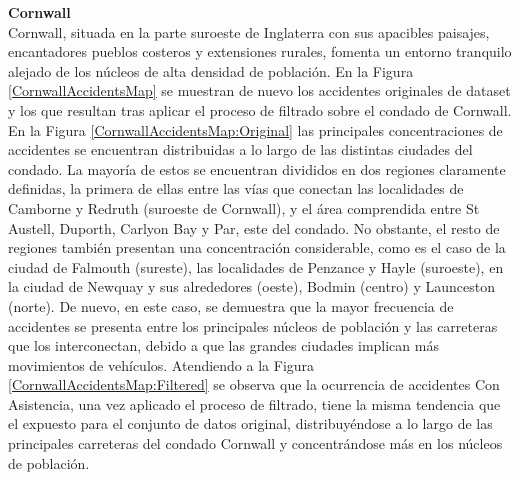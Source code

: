 \textbf{Cornwall}\\

Cornwall, situada en la parte suroeste de Inglaterra con sus apacibles paisajes, encantadores pueblos costeros y extensiones rurales, fomenta un entorno tranquilo alejado de los núcleos de alta densidad de población. En la Figura \ref{CornwallAccidentsMap} se muestran de nuevo los accidentes originales de dataset y los que resultan tras aplicar el proceso de filtrado sobre el condado de Cornwall. En la Figura \ref{CornwallAccidentsMap:Original} las principales concentraciones de accidentes se encuentran distribuidas a lo largo de las distintas ciudades del condado. La mayoría de estos se encuentran divididos en dos regiones claramente definidas, la primera de ellas entre las vías que conectan las localidades de Camborne y Redruth (suroeste de Cornwall), y el área comprendida entre St Austell, Duporth, Carlyon Bay y Par, este del condado. No obstante, el resto de regiones también presentan una concentración considerable, como es el caso de la ciudad de Falmouth (sureste), las localidades de Penzance y Hayle (suroeste), en la ciudad de Newquay y sus alrededores (oeste), Bodmin (centro) y Launceston (norte). De nuevo, en este caso, se demuestra que la mayor frecuencia de accidentes se presenta entre los principales núcleos de población y las carreteras que los interconectan, debido a que las grandes ciudades implican más movimientos de vehículos. Atendiendo a la Figura \ref{CornwallAccidentsMap:Filtered} se observa que la ocurrencia de accidentes Con Asistencia, una vez aplicado el proceso de filtrado, tiene la misma tendencia que el expuesto para el conjunto de datos original, distribuyéndose a lo largo de las principales carreteras del condado Cornwall y concentrándose más en los núcleos de población.



